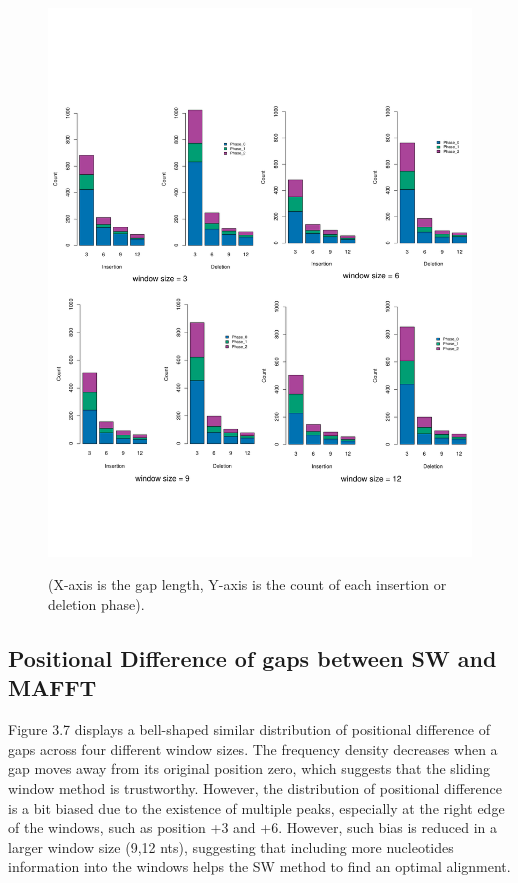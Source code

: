 \begin{figure}[H]
     \centering
     \begin{minipage}[t]{1\textwidth }
     \includegraphics[page=1,width=1\linewidth, height=1.2\linewidth]{Fig6.pdf}
     { {(X-axis is the gap length, Y-axis is the count of each insertion or deletion phase).}\par}
     \end{minipage}
\end{figure}
\newpage

\subsection{Positional Difference of gaps between SW and MAFFT}
Figure 3.7 displays a bell-shaped similar distribution of positional difference of gaps across four different window sizes. The frequency density decreases when a gap moves away from its original position zero, which suggests that the sliding window method is trustworthy. However, the distribution of positional difference is a bit biased due to the existence of multiple peaks, especially at the right edge of the windows, such as position +3 and +6. However, such bias is reduced in a larger window size (9,12 nts), suggesting that including more nucleotides information into the windows helps the SW method to find an optimal alignment. \\   
 

